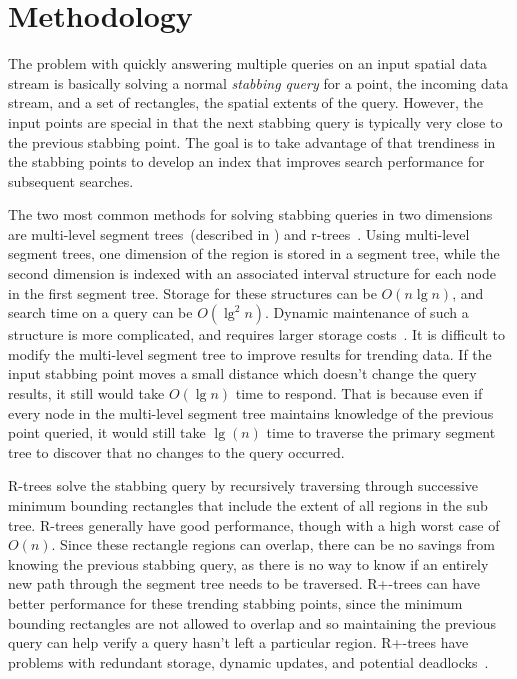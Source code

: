 \documentclass{sig-alternate}
\begin{document}
\section{Methodology}
\label{sec:methodology}

The problem with quickly answering multiple queries on an input
spatial data stream is basically solving a normal \emph{stabbing
  query} for a point, the incoming data stream, and a set of
rectangles, the spatial extents of the query.  However, the input
points are special in that the next stabbing query is typically very
close to the previous stabbing point.  The goal is to take advantage
of that trendiness in the stabbing points to develop an index that
improves search performance for subsequent searches.

The two most common methods for solving stabbing queries in two
dimensions are multi-level segment trees~(described in
\cite{berg00comput-geomet}) and r-trees~\cite{guttm84r-tree}.  Using
multi-level segment trees, one dimension of the region is stored in a
segment tree, while the second dimension is indexed with an associated
interval structure for each node in the first segment tree.  Storage
for these structures can be $O(n\lg{n})$, and search time on a query
can be $O(\lg^2{n})$.  Dynamic maintenance of such a structure is more
complicated, and requires larger storage
costs~\cite{kreveld-concatenavble}.  It is difficult to modify the
multi-level segment tree to improve results for trending data.  If the
input stabbing point moves a small distance which doesn't change the
query results, it still would take $O(\lg{n})$ time to respond.  That
is because even if every node in the multi-level segment tree
maintains knowledge of the previous point queried, it would still take
$\lg({n})$ time to traverse the primary segment tree to discover that
no changes to the query occurred.

R-trees solve the stabbing query by recursively traversing through
successive minimum bounding rectangles that include the extent of all
regions in the sub tree.  R-trees generally have good performance,
though with a high worst case of $O(n)$.  Since these rectangle
regions can overlap, there can be no savings from knowing the previous
stabbing query, as there is no way to know if an entirely new path
through the segment tree needs to be traversed.  R+-trees\cite{} can
have better performance for these trending stabbing points, since the
minimum bounding rectangles are not allowed to overlap and so
maintaining the previous query can help verify a query hasn't left a
particular region.  R+-trees have problems with redundant storage,
dynamic updates, and potential deadlocks~\cite{mano04r-trees}.
\end{document}
